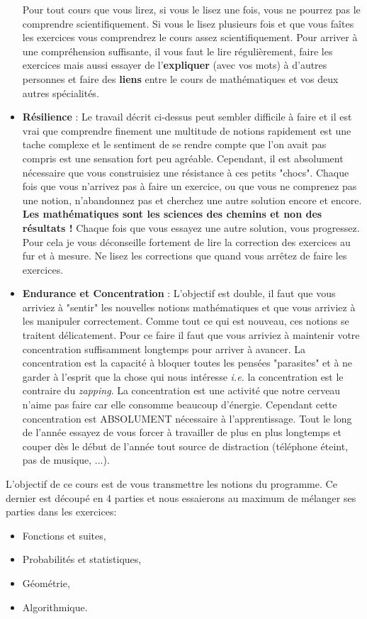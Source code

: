 \documentclass[12pt,fleqn]{report} %
\begin{document}
\begin{itemize}
	Pour tout cours que vous lirez, si vous le lisez une fois, vous ne pourrez pas le comprendre scientifiquement. Si vous le lisez plusieurs fois et que vous faîtes les exercices vous comprendrez le cours assez scientifiquement. Pour arriver à une compréhension suffisante, il vous faut le lire régulièrement, faire les exercices mais aussi  essayer de l'\textbf{expliquer} (avec vos mots) à d'autres personnes et faire des \textbf{liens} entre le cours de mathématiques et vos deux autres spécialités. 
	\item \textbf{Résilience} : Le travail décrit ci-dessus peut sembler difficile à faire et il est vrai que comprendre finement une multitude de notions rapidement est une tache complexe et le sentiment de se rendre compte que l'on avait pas compris est une sensation fort peu agréable. Cependant, il est absolument nécessaire que vous construisiez une résistance à ces petits "chocs". Chaque fois que vous n'arrivez pas à faire un exercice, ou que vous ne comprenez pas une notion, n'abandonnez pas et cherchez une autre solution encore et encore. \textbf{Les mathématiques sont les sciences des chemins et non des résultats !} {Chaque fois que vous essayez une autre solution, vous progressez.} Pour cela je vous déconseille fortement de lire la correction des exercices au fur et à mesure. Ne lisez les corrections que quand vous arrêtez de faire les exercices.
	\item \textbf{Endurance et Concentration} : L'objectif est double, il faut que vous arriviez à "sentir" les nouvelles notions mathématiques et que vous arriviez à les manipuler correctement. Comme tout ce qui est nouveau, ces notions se traitent délicatement. Pour ce faire il faut que vous arriviez à maintenir votre concentration suffisamment longtemps pour arriver à avancer. La concentration est la capacité à bloquer toutes les pensées "parasites" et à ne garder à l'esprit que la chose qui nous intéresse \emph{i.e.} la concentration est le contraire du \textit{zapping}. La concentration est une activité que notre cerveau n'aime pas faire car elle consomme beaucoup d'énergie. Cependant cette concentration est ABSOLUMENT nécessaire à l'apprentissage. Tout le long de l'année essayez de vous forcer à travailler de plus en plus longtemps et couper dès le début de l'année tout source de distraction (téléphone éteint, pas de musique, ...). 
\end{itemize}
\vspace{10pt}
L'objectif de ce cours est de vous transmettre les notions du programme. Ce dernier est découpé en 4 parties et nous essaierons au maximum de mélanger ses parties dans les exercices:
\begin{itemize}
	\item Fonctions et suites,
	\item Probabilités et statistiques,
	\item Géométrie,
	\item Algorithmique.
\end{itemize}
\end{document}
